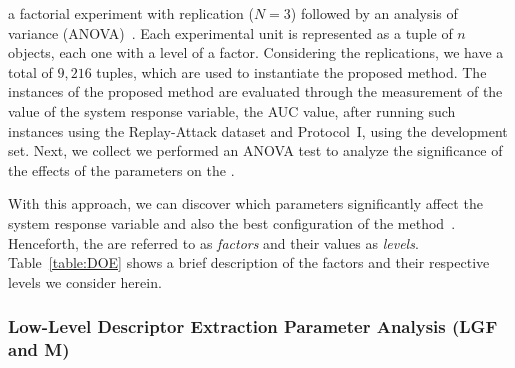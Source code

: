 a factorial experiment with replication ($N=3$) followed by an analysis of variance (ANOVA)~\cite{Walpole:PE:2007}. Each experimental unit is represented as a tuple of $n$ objects, each one with a level of a factor. Considering the replications, we have a total of {$9,216$ tuples}, which are used to instantiate the proposed method. The instances of the proposed method are evaluated through the measurement of the value of the system response variable, the AUC value, after running such instances using the Replay-Attack dataset and Protocol~I, using the development set. Next, we collect  we performed an ANOVA test to analyze the significance of the effects of the parameters on the . 

With this approach, we can discover which parameters significantly affect the system response variable and also the best configuration of the method~\cite{Hayter:CL:2012}. Henceforth, the  are referred to as \emph{factors} and their values as \emph{levels}. Table~\ref{table:DOE} shows a brief description of the factors and their respective levels we consider herein. 

\subsubsection{Low-Level Descriptor Extraction Parameter Analysis (LGF and M)}\label{sec:main_effect_1}


